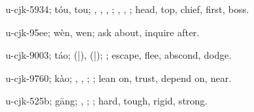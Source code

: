 \begin{multicols}{2}
{\cjkgGlue{}u-cjk-5934; tóu, tou; \cjkgGlue{}, \cjkgGlue{}, \cjkgGlue{}, \cjkgGlue{}; \cjkgGlue{}, \cjkgGlue{}, \cjkgGlue{}; head, top, chief, first, boss.

\cjkgGlue{}u-cjk-95ee; wèn, wen; ask about, inquire after.

\cjkgGlue{}u-cjk-9003; táo; \cjkgGlue{}\cjkgGlue{}(\cjkgGlue{}|\cjkgGlue{}), \cjkgGlue{}\cjkgGlue{}(\cjkgGlue{}|\cjkgGlue{}); \cjkgGlue{}; escape, flee, abscond, dodge.

\cjkgGlue{}u-cjk-9760; kào; \cjkgGlue{}\cjkgGlue{}\cjkgGlue{}, \cjkgGlue{}\cjkgGlue{}\cjkgGlue{}, \cjkgGlue{}\cjkgGlue{}\cjkgGlue{}; \cjkgGlue{}; lean on, trust, depend on, near.

\cjkgGlue{}u-cjk-525b; gāng; \cjkgGlue{}, \cjkgGlue{}; \cjkgGlue{}; hard, tough, rigid, strong.

}
\end{multicols}
